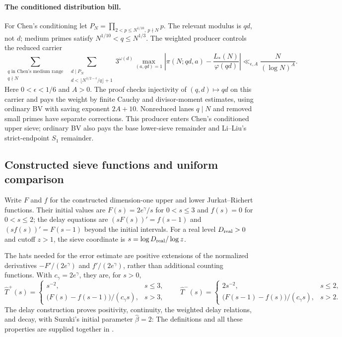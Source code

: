 \paragraph{The conditioned distribution bill.}
For Chen's conditioning let $P_N=\prod_{2<p\le N^{1/10},\ p\nmid N}p$.
The relevant modulus is $qd$, not $d$; medium primes satisfy
$N^{1/10}<q\le N^{1/3}$. The weighted producer controls the reduced carrier
\[
 \sum_{\substack{q\text{ in Chen's medium range}\\q\nmid N}}
 \ \sum_{\substack{d\mid P_N\\d<\lfloor N^{1/2-\epsilon}/q\rfloor+1}}
 3^{\omega(d)}\max_{(a,qd)=1}
 \left|\pi(N;qd,a)-\frac{L_*(N)}{\varphi(qd)}\right|
 \ll_{\epsilon,A}\frac{N}{(\log N)^A}.
\]
Here $0<\epsilon<1/6$ and $A>0$.
The proof checks injectivity of $(q,d)\mapsto qd$ on this carrier and pays the
weight by finite Cauchy and divisor-moment estimates, using ordinary BV with
saving exponent $2A+10$.
Nonreduced lanes $q\mid N$ and removed small primes have separate corrections.
This producer enters Chen's conditioned upper sieve; ordinary BV also pays the
base lower-sieve remainder and Li--Liu's strict-endpoint $S_1$ remainder.

\subsection{Constructed sieve functions and uniform comparison}

Write $F$ and $f$ for the constructed dimension-one upper and lower
Jurkat--Richert functions. Their initial values are $F(s)=2e^\gamma/s$
for $0<s\le3$ and $f(s)=0$ for $0<s\le2$; the delay equations are
$(sF(s))'=f(s-1)$ and $(sf(s))'=F(s-1)$ beyond the initial intervals.
For a real level $D_{\rm real}>0$ and cutoff $z>1$, the sieve coordinate is
$s=\log D_{\rm real}/\log z$.

The hats needed for the error estimate are positive extensions of the
normalized derivatives $-F'/(2e^\gamma)$ and $f'/(2e^\gamma)$, rather
than additional counting functions. With $c_\gamma=2e^\gamma$, they are,
for $s>0$,
\[
 \widehat T^+(s)=
 \begin{cases}s^{-2},&s\le3,\\
 \bigl(F(s)-f(s-1)\bigr)/(c_\gamma s),&s>3,
 \end{cases}
 \qquad
 \widehat T^-(s)=
 \begin{cases}2s^{-2},&s\le2,\\
 \bigl(F(s-1)-f(s)\bigr)/(c_\gamma s),&s>2.
 \end{cases}
\]
The delay construction proves positivity, continuity, the weighted delay
relations, and decay, with Suzuki's initial parameter $\widehat\beta=2$:
The definitions and all these properties are supplied together in
.


